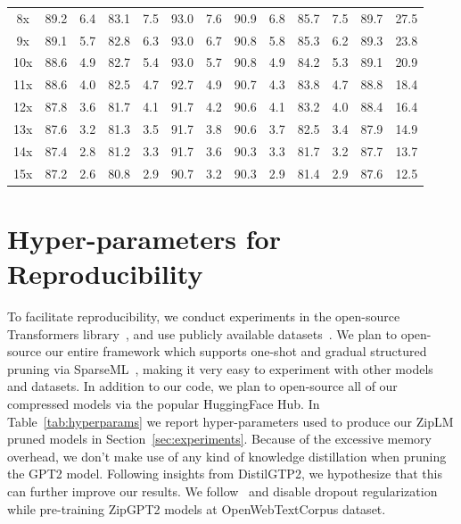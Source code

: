 \documentclass{article}
\newcommand{\ourmethod}{ZipLM}
\theoremstyle{plain}
\theoremstyle{definition}
\theoremstyle{remark}
\begin{document}
\begin{table}
{\begin{tabular}{c|cc|cc|cc|cc|cc|cc}
        \phantom{3}8x & 89.2 & \phantom{3}6.4 & 83.1 & \phantom{3}7.5 & 93.0 & \phantom{3}7.6 & 90.9 & \phantom{3}6.8 & 85.7 & \phantom{3}7.5 & 89.7 & \phantom{1}27.5 \\ 
        \phantom{3}9x & 89.1 & \phantom{3}5.7 & 82.8 & \phantom{3}6.3 & 93.0 & \phantom{3}6.7 & 90.8 & \phantom{3}5.8 & 85.3 & \phantom{3}6.2 & 89.3 & \phantom{1}23.8 \\ 
        10x & 88.6 & \phantom{3}4.9 & 82.7 & \phantom{3}5.4 & 93.0 & \phantom{3}5.7 & 90.8 & \phantom{3}4.9 & 84.2 & \phantom{3}5.3 & 89.1 & \phantom{1}20.9 \\ 
        11x & 88.6 & \phantom{3}4.0 & 82.5 & \phantom{3}4.7 & 92.7 & \phantom{3}4.9 & 90.7 & \phantom{3}4.3 & 83.8 & \phantom{3}4.7 & 88.8 & \phantom{1}18.4 \\ 
        12x & 87.8 & \phantom{3}3.6 & 81.7 & \phantom{3}4.1 & 91.7 & \phantom{3}4.2 & 90.6 & \phantom{3}4.1 & 83.2 & \phantom{3}4.0 & 88.4 & \phantom{1}16.4 \\ 
        13x & 87.6 & \phantom{3}3.2 & 81.3 & \phantom{3}3.5 & 91.7 & \phantom{3}3.8 & 90.6 & \phantom{3}3.7 & 82.5 & \phantom{3}3.4 & 87.9 & \phantom{1}14.9 \\ 
        14x & 87.4 & \phantom{3}2.8 & 81.2 & \phantom{3}3.3 & 91.7 & \phantom{3}3.6 & 90.3 & \phantom{3}3.3 & 81.7 & \phantom{3}3.2 & 87.7 & \phantom{1}13.7 \\ 
        15x & 87.2 & \phantom{3}2.6 & 80.8 & \phantom{3}2.9 & 90.7 & \phantom{3}3.2 & 90.3 & \phantom{3}2.9 & 81.4 & \phantom{3}2.9 & 87.6 & \phantom{1}12.5 \\ 
        \bottomrule
        \end{tabular}
    }
\end{table}

\section{Hyper-parameters for Reproducibility}
\label{app:hyperparams}
To facilitate reproducibility, we conduct experiments in the open-source Transformers library~\citep{wolf-etal-2020-transformers}, and use publicly available datasets~\citep{hf-datasets}. We plan to open-source our entire framework which supports one-shot and gradual structured pruning via SparseML~\citep{pmlr-v119-kurtz20a}, making it very easy to experiment with other models and datasets. In addition to our code, we plan to open-source all of our compressed models via the popular HuggingFace Hub. In Table~\ref{tab:hyperparams} we report hyper-parameters used to produce our \ourmethod{} pruned models in Section~\ref{sec:experiments}. Because of the excessive memory overhead, we don't make use of any kind of knowledge distillation when pruning the GPT2 model. Following insights from DistilGTP2, we hypothesize that this can further improve our results. We follow~\cite{komatsuzaki2019one} and disable dropout regularization while pre-training ZipGPT2 models at OpenWebTextCorpus dataset.
\end{document}
